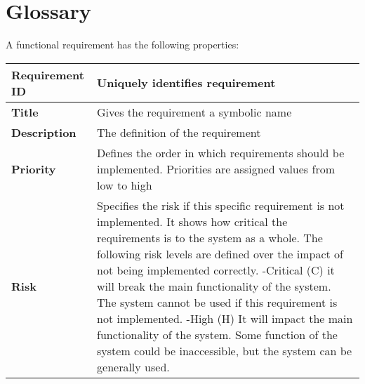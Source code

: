 \section*{Glossary}

A functional requirement has the following properties:

\begin{center}
	\def\arraystretch{1.5}%
    \begin{tabular}{ | p{5cm} | p{5cm} |}
    \hline
    	\textbf{Requirement ID} & Uniquely identifies requirement \\ \hline
		\textbf{Title} & Gives the requirement a symbolic name\\ \hline
		\textbf{Description} & The definition of the requirement\\ \hline
		\textbf{Priority} & Defines the order in which requirements should be implemented. Priorities are assigned values from low to high\\ \hline
		\textbf{Risk} & Specifies the risk if this specific requirement is not implemented. It shows how critical the requirements is to the system as a whole. The following risk levels are defined over the impact of not being implemented correctly.
 -Critical (C) it will break the main functionality of the system. The system cannot be used if this requirement is not implemented.
 -High (H) It will impact the main functionality of the system. Some function of the system could be inaccessible, but the system can be generally used.\\
      \hline
    \end{tabular}
\end{center}
